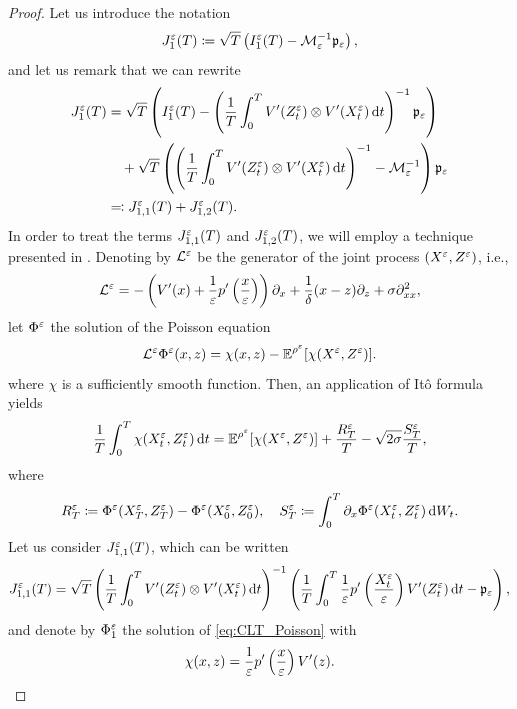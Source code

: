 \documentclass[10pt]{article}
\begin{document}
\begin{proof}
	 Let us introduce the notation
	\begin{equation}
		J_1^\varepsilon(T) \coloneqq \sqrt{T}\left( I_1^\varepsilon(T) - \mathcal M_\varepsilon^{-1} \mathfrak p_\varepsilon\right),
	\end{equation}
	and let us remark that we can rewrite
	\begin{equation} \label{eq:decomposition_first_term}
	\begin{aligned}
	J_1^\varepsilon(T) &= \sqrt{T} \left( I_1^\varepsilon(T) - \left(\frac1T \int_0^T V'(Z^\varepsilon_t) \otimes V'(X^\varepsilon_t) \,\mathrm{d} t\right)^{-1}\mathfrak p_\varepsilon \right) \\
	& \quad + \sqrt{T} \left(\left(\frac1T \int_0^T V'(Z^\varepsilon_t) \otimes V'(X^\varepsilon_t) \,\mathrm{d} t\right)^{-1} - \mathcal M_\varepsilon^{-1}\right) \mathfrak p_\varepsilon\\
	&\eqqcolon J_{1,1}^\varepsilon(T) + J_{1,2}^\varepsilon(T).
	\end{aligned}
	\end{equation}
	In order to treat the terms $J_{1,1}^\varepsilon(T)$ and $J_{1,2}^\varepsilon(T)$, we will employ a technique presented in \cite[Remark 6.17]{PaS08}. Denoting by $\mathcal L^\varepsilon$ be the generator of the joint process $(X^\varepsilon, Z^\varepsilon)$, i.e.,
	\begin{equation}
		\mathcal L^\varepsilon = -\left(V'(x) + \frac1{\varepsilon} p'\left(\frac{x}{\varepsilon}\right)\right)\partial_x + \frac1\delta (x - z) \partial_z  + \sigma \partial^2_{xx},
	\end{equation}
	let $\Phi^\varepsilon$ the solution of the Poisson equation
	\begin{equation}\label{eq:CLT_Poisson}
		\mathcal L^\varepsilon \Phi^\varepsilon(x, z) = \chi(x, z) - \operatorname{\mathbb{E}}^{\rho^\varepsilon}[\chi(X^\varepsilon, Z^\varepsilon)].
	\end{equation}	
	where $\chi$ is a sufficiently smooth function. Then, an application of Itô formula  yields
	\begin{equation}
	\frac{1}{T} \int_0^T  \chi(X_t^\varepsilon, Z_t^\varepsilon) \,\mathrm{d} t = \operatorname{\mathbb{E}}^{\rho^\varepsilon}[\chi(X^\varepsilon, Z^\varepsilon)] + \frac{R_T^\varepsilon}{T} - \sqrt{2\sigma}\frac{S^\varepsilon_T}{T},
	\end{equation}
	where
	\begin{equation}
		R_T^\varepsilon \coloneqq \Phi^\varepsilon(X^\varepsilon_T, Z^\varepsilon_T) - \Phi^\varepsilon(X^\varepsilon_0, Z^\varepsilon_0), \quad S^\varepsilon_T \coloneqq \int_0^T \partial_x \Phi^\varepsilon(X_t^\varepsilon, Z_t^\varepsilon) \,\mathrm{d} W_t.
	\end{equation}
	Let us consider $J_{1,1}^\varepsilon(T)$, which can be written
	\begin{equation}
	J_{1,1}^\varepsilon(T) = \sqrt{T} \left(\frac1T \int_0^T V'(Z^\varepsilon_t) \otimes V'(X^\varepsilon_t) \,\mathrm{d} t\right)^{-1} \left( \frac{1}{T} \int_0^T \frac{1}{\varepsilon} p' \left ( \frac{X^\varepsilon_t}{\varepsilon} \right ) V'(Z^\varepsilon_t) \,\mathrm{d} t - \mathfrak p_\varepsilon \right),
	\end{equation}
	and denote by $\Phi_1^\varepsilon$ the solution of \eqref{eq:CLT_Poisson} with 
	\begin{equation}
		\chi(x, z) = \frac 1 {\varepsilon} p' \left ( \frac x {\varepsilon} \right ) V'(z).
	\end{equation}
	

\end{proof}
\end{document}

